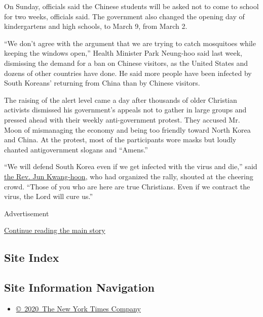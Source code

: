 On Sunday, officials said the Chinese students will be asked not to come
to school for two weeks, officials said. The government also changed the
opening day of kindergartens and high schools, to March 9, from March 2.

``We don't agree with the argument that we are trying to catch
mosquitoes while keeping the windows open,'' Health Minister Park
Neung-hoo said last week, dismissing the demand for a ban on Chinese
visitors, as the United States and dozens of other countries have done.
He said more people have been infected by South Koreans' returning from
China than by Chinese visitors.

The raising of the alert level came a day after thousands of older
Christian activists dismissed his government's appeals not to gather in
large groups and pressed ahead with their weekly anti-government
protest. They accused Mr. Moon of mismanaging the economy and being too
friendly toward North Korea and China. At the protest, most of the
participants wore masks but loudly chanted antigovernment slogans and
``Amens.''

``We will defend South Korea even if we get infected with the virus and
die,'' said
\href{https://www.nytimes.com/2019/11/08/world/asia/jun-kwang-hoon-pastor-.html}{the
Rev. Jun Kwang-hoon}, who had organized the rally, shouted at the
cheering crowd. ``Those of you who are here are true Christians. Even if
we contract the virus, the Lord will cure us.''

Advertisement

\protect\hyperlink{after-bottom}{Continue reading the main story}

\hypertarget{site-index}{%
\subsection{Site Index}\label{site-index}}

\hypertarget{site-information-navigation}{%
\subsection{Site Information
Navigation}\label{site-information-navigation}}

\begin{itemize}
\tightlist
\item
  \href{https://help.nytimes.com/hc/en-us/articles/115014792127-Copyright-notice}{©~2020~The
  New York Times Company}
\end{itemize}

